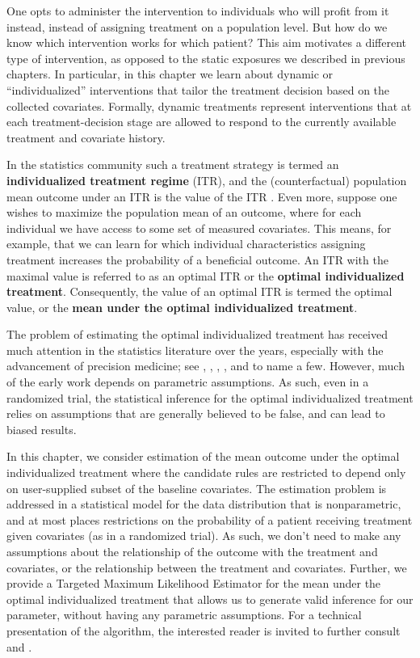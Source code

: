 \documentclass[12pt, krantz2,]{krantz}
\theoremstyle{definition}
\theoremstyle{definition}
\theoremstyle{definition}
\newcommand{\1}{\mathbbm{1}}
\begin{document}
One opts to administer the intervention to individuals who will profit from it instead,
instead of assigning treatment on a population level. But how do we know which
intervention works for which patient? This aim motivates a different type of
intervention, as opposed to the static exposures we described in previous chapters. In
particular, in this chapter we learn about dynamic or ``individualized''
interventions that tailor the treatment decision based on the collected
covariates. Formally, dynamic treatments represent interventions that at each
treatment-decision stage are allowed to respond to the currently available
treatment and covariate history.

In the statistics community such a treatment strategy is termed an
\textbf{individualized treatment regime} (ITR), and the (counterfactual) population
mean outcome under an ITR is the value of the ITR \citep{neyman1990, robins1986, pearl2009}. Even more, suppose one wishes to maximize the population mean of an
outcome, where for each individual we have access to some set of measured
covariates. This means, for example, that we can learn for which individual
characteristics assigning treatment increases the probability of a beneficial
outcome. An ITR with the maximal value is referred to as an
optimal ITR or the \textbf{optimal individualized treatment}. Consequently, the value
of an optimal ITR is termed the optimal value, or the \textbf{mean under the optimal
individualized treatment}.

The problem of estimating the optimal individualized treatment has received much
attention in the statistics literature over the years, especially with the
advancement of precision medicine; see \citet{murphy2003}, \citet{robins2004}, \citet{laber2012},
\citet{kosorok2012}, \citet{moodie2013} and \citet{robins2014} to name a few. However, much of the
early work depends on parametric assumptions. As such, even in a randomized
trial, the statistical inference for the optimal individualized treatment relies
on assumptions that are generally believed to be false, and can lead to biased
results.

In this chapter, we consider estimation of the mean outcome under the optimal
individualized treatment where the candidate rules are restricted to depend only
on user-supplied subset of the baseline covariates. The estimation problem is
addressed in a statistical model for the data distribution that is
nonparametric, and at most places restrictions on the probability of a patient
receiving treatment given covariates (as in a randomized trial). As such, we
don't need to make any assumptions about the relationship of the outcome with
the treatment and covariates, or the relationship between the treatment and
covariates. Further, we provide a Targeted Maximum Likelihood Estimator for the
mean under the optimal individualized treatment that allows us to generate valid
inference for our parameter, without having any parametric assumptions. For a
technical presentation of the algorithm, the interested reader is invited to
further consult \citet{vanderLaanLuedtke15} and \citet{luedtke2016super}.
\end{document}
